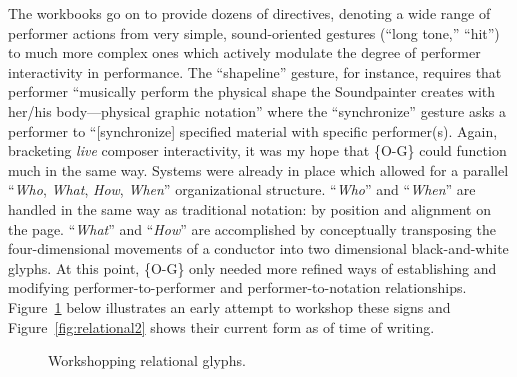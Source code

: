     The workbooks go on to provide dozens of directives, denoting a wide range of performer actions from very simple, sound-oriented gestures (``long tone,'' ``hit'') to much more complex ones which actively modulate the degree of performer interactivity in performance. The ``shapeline'' gesture, for instance, requires that performer ``musically perform the physical shape the Soundpainter creates with her/his body---physical graphic notation'' where the ``synchronize'' gesture asks a performer to ``[synchronize] specified material with specific performer(s).\autocite[34--5]{Thompson_2006_1} Again, bracketing \textit{live} composer interactivity, it was my hope that \{O-G\} could function much in the same way. Systems were already in place which allowed for a parallel ``\textit{Who}, \textit{What}, \textit{How}, \textit{When}'' organizational structure. ``\textit{Who}'' and ``\textit{When}'' are handled in the same way as traditional notation: by position and alignment on the page. ``\textit{What}'' and ``\textit{How}'' are accomplished by conceptually transposing the four-dimensional movements of a conductor into two dimensional black-and-white glyphs. At this point, \{O-G\} only needed more refined ways of establishing and modifying performer-to-performer and performer-to-notation relationships. Figure~\ref{fig:relational1} below illustrates an early attempt to workshop these signs and Figure~\ref{fig:relational2} shows their current form as of time of writing.

        \begin{figure}
            \centering
            \captionsetup{width=.5\textwidth} 
            \caption{Workshopping relational glyphs.}
            \label{fig:relational1}
        \end{figure}

